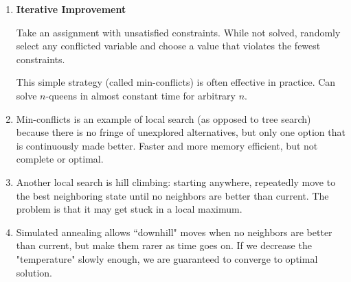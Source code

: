 \documentclass[10pt]{article}
\begin{document}
\begin{multicols}{2}
\begin{addmargin}[0.8em]{0.5em}
\begin{enumerate}[label=(\alph*)]
        \item \textbf{Iterative Improvement}
        
        Take an assignment with unsatisfied constraints. While not solved, randomly select any conflicted variable and choose a value that violates the fewest constraints.
        
        This simple strategy (called min-conflicts) is often effective in practice. Can solve $n$-queens in almost constant time for arbitrary $n$.
        
        \item Min-conflicts is an example of local search (as opposed to tree search) because there is no fringe of unexplored alternatives, but only one option that is continuously made better. Faster and more memory efficient, but not complete or optimal.
        
        \item Another local search is hill climbing: starting anywhere, repeatedly move to the best neighboring state until no neighbors are better than current. The problem is that it may get stuck in a local maximum.
        
        \item Simulated annealing allows ``downhill" moves when no neighbors are better than current, but make them rarer as time goes on. If we decrease the "temperature" slowly enough, we are guaranteed to converge to optimal solution.

    \end{enumerate}
    

\end{addmargin}
\end{multicols}
\end{document}

